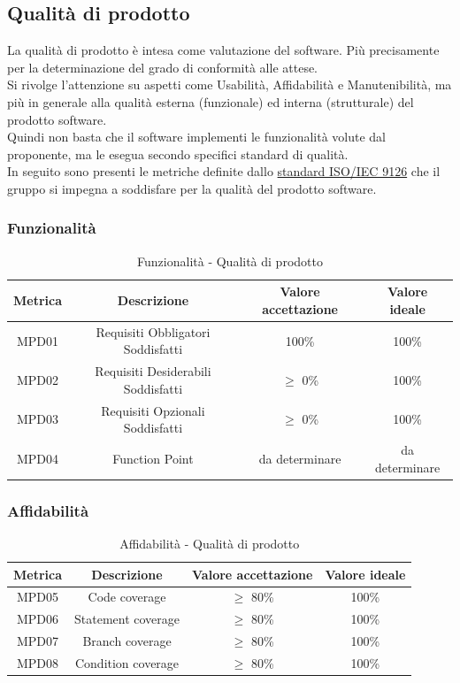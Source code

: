 \documentclass[10pt]{article}
\begin{document}
\begin{justify}
\subsection{Qualità di prodotto}
La qualità di prodotto è intesa come valutazione del software. Più precisamente per la determinazione del grado di conformità alle attese.\\
Si rivolge l'attenzione su aspetti come Usabilità, Affidabilità e Manutenibilità, ma più in generale alla qualità esterna (funzionale) ed interna (strutturale) del prodotto software.\\
Quindi non basta che il software implementi le funzionalità volute dal proponente, ma le esegua secondo specifici standard di qualità.\\
In seguito sono presenti le metriche definite dallo \hyperref[ISO 9126]{standard ISO/IEC 9126} che il gruppo si impegna a soddisfare per la qualità del prodotto software.
\subsubsection{Funzionalità}
\begin{table}[H]
  \centering
\begin{tabular}{|c|c|c|c|}
  \hline
  \textbf{Metrica} & \textbf{Descrizione} & \textbf{Valore accettazione} & \textbf{Valore ideale}\\
  \hline
  MPD01 & Requisiti Obbligatori Soddisfatti & 100\% & 100\%\\
  \hline
  MPD02 & Requisiti Desiderabili Soddisfatti  & $\geq$ 0\% & 100\% \\
  \hline
  MPD03 & Requisiti Opzionali Soddisfatti & $\geq$ 0\% & 100\% \\
  \hline
  MPD04 & Function Point & da determinare & da determinare \\ 
  \hline
\end{tabular}
\caption{Funzionalità - Qualità di prodotto}
\label{tab:funzionalità}
\end{table}

\subsubsection{Affidabilità}
\begin{table}[H]
  \centering
\begin{tabular}{|c|c|c|c|}
  \hline
  \textbf{Metrica} & \textbf{Descrizione} & \textbf{Valore accettazione} & \textbf{Valore ideale}\\
  \hline
  MPD05 & Code coverage & $\geq$ 80\% & 100\% \\
  \hline
  MPD06 & Statement coverage & $\geq$ 80\% & 100\% \\
  \hline
  MPD07 & Branch coverage & $\geq$ 80\% & 100\% \\
  \hline
  MPD08 & Condition coverage & $\geq$ 80\% & 100\% \\
  \hline
\end{tabular}
\caption{Affidabilità - Qualità di prodotto}
\label{tab:affidabilità}
\end{table}


\end{justify}
\end{document}
